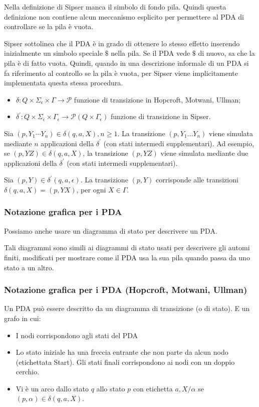 Nella definizione di Sipser manca il simbolo di fondo pila. Quindi questa definizione non contiene alcun meccanismo esplicito per permettere al PDA di controllare se la pila è vuota.

Sipser sottolinea che il PDA è in grado di ottenere lo stesso effetto inserendo inizialmente un simbolo speciale $\$$ nella pila. Se il PDA vede $\$$ di nuovo, sa che la pila è di fatto vuota.
Quindi, quando in una descrizione informale di un PDA si fa riferimento al controllo se la pila è vuota, per Sipser viene implicitamente implementata questa stessa procedura.

\begin{itemize}
    \item $\delta: Q \times \Sigma_{\epsilon} \times \Gamma \rightarrow \mathcal{P}$ funzione di transizione in Hopcroft, Motwani, Ullman;
    \item $\delta^{\prime}: Q \times \Sigma_{\epsilon} \times \Gamma_{\epsilon} \rightarrow \mathcal{P}\left(Q \times \Gamma_{\epsilon}\right)$ funzione di transizione in Sipser.
\end{itemize}

Sia $\left(p, Y_{1} \cdots Y_{n}\right) \in \delta(q, a, X), n \geq 1$. La transizione $\left(p, Y_{1} \ldots Y_{n}\right)$ viene simulata mediante $n$ applicazioni della $\delta^{\prime}$ (con stati intermedi supplementari). Ad esempio, se $(p, Y Z) \in \delta(q, a, X)$, la transizione $(p, Y Z)$ viene simulata mediante due applicazioni della $\delta^{\prime}$ (con stati intermedi supplementari).


Sia $(p, Y) \in \delta^{\prime}(q, a, \epsilon)$. La transizione $(p, Y)$ corrisponde alle transizioni $\delta(q, a, X)=(p, Y X)$, per ogni $X \in \Gamma$.

\subsubsection{Notazione grafica per i PDA}
Possiamo anche usare un diagramma di stato per descrivere un
PDA.

Tali diagrammi sono simili ai diagrammi di stato usati per
descrivere gli automi finiti, modificati per mostrare come il PDA
usa la sua pila quando passa da uno stato a un altro.

\subsubsection{Notazione grafica per i PDA (Hopcroft, Motwani, Ullman)}
Un PDA può essere descritto da un diagramma di transizione (o di stato).
E un grafo in cui:
\begin{itemize}
    \item I nodi corrispondono agli stati del PDA
    \item Lo stato iniziale ha una freccia entrante che non parte da alcun nodo (etichettata Start). Gli stati finali corrispondono ai nodi con un doppio cerchio.
    \item Vi è un arco dallo stato $q$ allo stato $p$ con etichetta $a, X / \alpha$ se $(p, \alpha) \in \delta(q, a, X)$.
\end{itemize}

